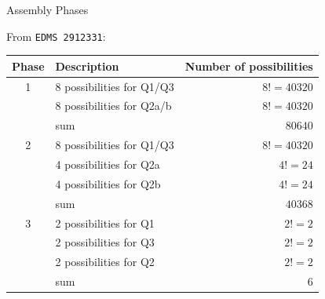 \documentclass[usenames,dvipsnames,aspectratio=169,table]{beamer}
\begin{document}
\begin{frame}
    {Assembly Phases}

    From \texttt{EDMS 2912331}:\\[0.5em]

    \begin{tabular}{c|l|r}
        \textbf{Phase} & \textbf{Description} & \textbf{Number of possibilities}\\
        \hline
        1 & 8 possibilities for Q1/Q3 & $8! = 40320$\\
          & 8 possibilities for Q2a/b & $8! = 40320$\\
          \hline 
          & sum                       & $80640$\\
          \hline 
          \hline 
        2 & 8 possibilities for Q1/Q3 & $8! = 40320$\\
          & 4 possibilities for Q2a   & $4! = 24$\\
          & 4 possibilities for Q2b   & $4! = 24$\\
          \hline 
          & sum                       & $40368$\\
          \hline 
          \hline 
        3 & 2 possibilities for Q1   & $2! = 2$\\
          & 2 possibilities for Q3   & $2! = 2$\\
          & 2 possibilities for Q2   & $2! = 2$\\
          \hline 
          & sum                       & $6$\\
          \hline 
          \hline 
    \end{tabular}
\end{frame}

\end{document}
